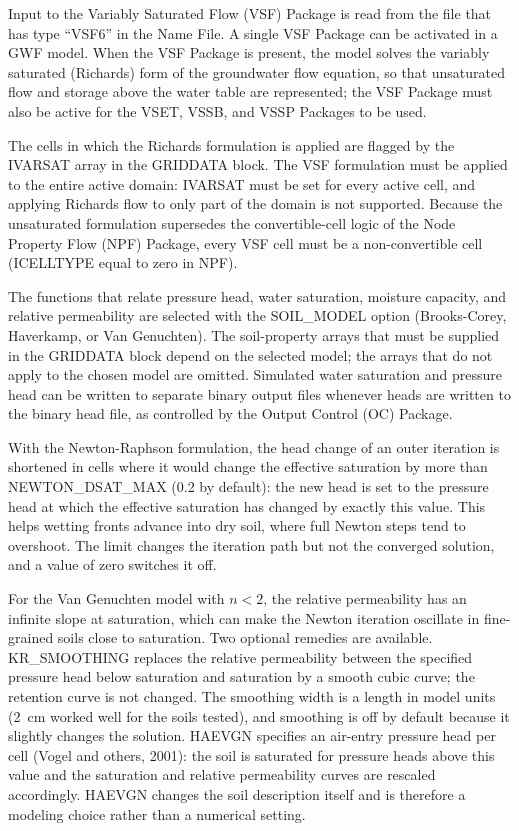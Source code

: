 Input to the Variably Saturated Flow (VSF) Package is read from the file that has type ``VSF6'' in the Name File.  A single VSF Package can be activated in a GWF model.  When the VSF Package is present, the model solves the variably saturated (Richards) form of the groundwater flow equation, so that unsaturated flow and storage above the water table are represented; the VSF Package must also be active for the VSET, VSSB, and VSSP Packages to be used.

The cells in which the Richards formulation is applied are flagged by the IVARSAT array in the GRIDDATA block.  The VSF formulation must be applied to the entire active domain: IVARSAT must be set for every active cell, and applying Richards flow to only part of the domain is not supported.  Because the unsaturated formulation supersedes the convertible-cell logic of the Node Property Flow (NPF) Package, every VSF cell must be a non-convertible cell (ICELLTYPE equal to zero in NPF).

The functions that relate pressure head, water saturation, moisture capacity, and relative permeability are selected with the SOIL\_MODEL option (Brooks-Corey, Haverkamp, or Van Genuchten).  The soil-property arrays that must be supplied in the GRIDDATA block depend on the selected model; the arrays that do not apply to the chosen model are omitted.  Simulated water saturation and pressure head can be written to separate binary output files whenever heads are written to the binary head file, as controlled by the Output Control (OC) Package.

With the Newton-Raphson formulation, the head change of an outer iteration is shortened in cells where it would change the effective saturation by more than NEWTON\_DSAT\_MAX (0.2 by default): the new head is set to the pressure head at which the effective saturation has changed by exactly this value.  This helps wetting fronts advance into dry soil, where full Newton steps tend to overshoot.  The limit changes the iteration path but not the converged solution, and a value of zero switches it off.

For the Van Genuchten model with $n < 2$, the relative permeability has an infinite slope at saturation, which can make the Newton iteration oscillate in fine-grained soils close to saturation.  Two optional remedies are available.  KR\_SMOOTHING replaces the relative permeability between the specified pressure head below saturation and saturation by a smooth cubic curve; the retention curve is not changed.  The smoothing width is a length in model units (2~cm worked well for the soils tested), and smoothing is off by default because it slightly changes the solution.  HAEVGN specifies an air-entry pressure head per cell (Vogel and others, 2001): the soil is saturated for pressure heads above this value and the saturation and relative permeability curves are rescaled accordingly.  HAEVGN changes the soil description itself and is therefore a modeling choice rather than a numerical setting.

